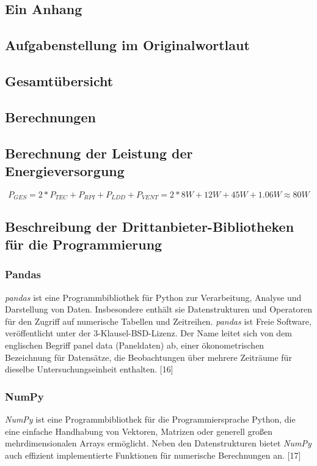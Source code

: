 \begin{appendix} %
\section{Ein Anhang}


\subsection{Aufgabenstellung im Originalwortlaut}


\subsection{Gesamtübersicht}


\subsection{Berechnungen}

\subsection{Berechnung der Leistung der Energieversorgung}
\begin{equation}
P_{GES} = 2*P_{TEC}+P_{RPI}+P_{LDD}+P_{VENT} = 2*8W+12W+45W+1.06W \approx 80W
    \label{formula:_calculation_sp_power}
\end{equation}

\subsection{Beschreibung der Drittanbieter-Bibliotheken für die Programmierung}
\subsubsection{Pandas}
\textit{pandas} ist eine Programmbibliothek für Python zur Verarbeitung, Analyse und Darstellung von Daten. Insbesondere enthält sie Datenstrukturen und Operatoren für den Zugriff auf numerische Tabellen und Zeitreihen. \textit{pandas} ist Freie Software, veröffentlicht unter der 3-Klausel-BSD-Lizenz. Der Name leitet sich von dem englischen Begriff panel data (Paneldaten) ab, einer ökonometrischen Bezeichnung für Datensätze, die Beobachtungen über mehrere Zeiträume für dieselbe Untersuchungseinheit enthalten. [16]

\subsubsection{NumPy}
\textit{NumPy} ist eine Programmbibliothek für die Programmiersprache Python, die eine einfache Handhabung von Vektoren, Matrizen oder generell großen mehrdimensionalen Arrays ermöglicht. Neben den Datenstrukturen bietet \textit{NumPy} auch effizient implementierte Funktionen für numerische Berechnungen an. [17]


\end{appendix}
